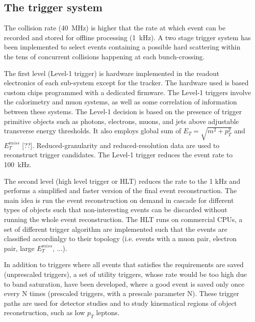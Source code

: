 \subsection{The trigger system}
The collision rate (40~MHz) is higher that the rate at which event can be recorded and stored for
offline processing (1~kHz). A two stage trigger system has been implemented to select events containing
a possible hard scattering within the tens of concurrent collisions happening at each bunch-crossing.

The first level (Level-1 trigger) is hardware  implemented in the readout electronics of each sub-system except for
the tracker. The hardware used is based custom chips programmed with a dedicated firmware.
The Level-1 triggers involve the calorimetry and muon systems, as well as some correlation
of information between these systems. The Level-1 decision is based on the presence of trigger
primitive objects such as photons, electrons, muons, and jets above adjustable transverse energy thresholds.
It also employs global sum of $E_T = \sqrt{m^2 + p_T^2}$ and $E_T^{miss}$ [??]. Reduced-granularity and
reduced-resolution data are used to reconstruct trigger candidates.
The Level-1 trigger reduces the event rate to 100~kHz.

The second level (high level trigger or HLT) reduces the rate to the 1 kHz and performs a simplified and faster
version of the final event reconstruction. The main idea is run the event reconstruction on demand in cascade for
different types of objects such that non-interesting events can be discarded without running the whole
event reconstruction. The HLT runs on commercial CPUs, 
a set of different trigger algorithm are implemented such that the events are classified accordinlgy
to their topology (i.e. events with a muon pair, electron pair, large $E_T^{miss}$, ...).

In addition to triggers where all events that satisfies the requirements are saved (unprescaled
triggers), a set of utility triggers, whose rate would be too high due to band saturation, have
been developed, where a good event is saved only once every N times (prescaled triggers, with
a prescale parameter N). These trigger paths are used for detector studies and to study kinematical
regions of object reconstruction, such as low $p_T$ leptons.

